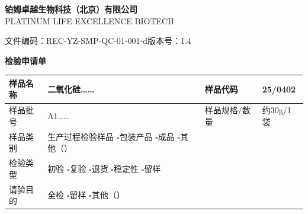 \documentclass[UTF8,10pt,a4paper,fontset=fandol]{ctexart}
\newcommand{\fieldvalue}[1]{#1}
\newcommand{\handwritten}[1]{#1}
\begin{document}
\noindent
\begin{minipage}{0.28\textwidth}
\small
\textbf{铂姆卓越生物科技（北京）有限公司}\\[-0.2em]
\scriptsize PLATINUM LIFE EXCELLENCE BIOTECH
\end{minipage}
\hfill
\begin{minipage}{0.68\textwidth}
\raggedleft
文件编码：REC-YZ-SMP-QC-01-001-d\qquad 版本号：1.4
\end{minipage}

\vspace{0.3em}

\begin{center}
\textbf{\large 检验申请单}
\end{center}

\small
\begin{tabularx}{\textwidth}{|>{\centering\arraybackslash}p{2.2cm}|X|>{\centering\arraybackslash}p{2.2cm}|X|}
\hline
样品名称 &
\fieldvalue{\handwritten{二氧化硅……}} &
样品代码 &
\fieldvalue{\handwritten{25/0402}}
\\ \hline

样品批号 &
\fieldvalue{\handwritten{A1……}} &
样品规格/数量 &
\fieldvalue{\handwritten{约30g/1袋}}
\\ \hline

样品类别 &
\fieldvalue{\handwritten{\checkmark}}生产过程检验样品
\quad $\square$包装产品
\quad $\square$成品
\newline
\hspace*{2.2cm}$\square$其他（\hspace{2cm}） &
\multicolumn{2}{l|}{}
\\ \hline

检验类型 &
\fieldvalue{\handwritten{\checkmark}}初验
\quad $\square$复验
\quad $\square$退货
\quad $\square$稳定性
\quad $\square$留样
&
\multicolumn{2}{l|}{}
\\ \hline

请验目的 &
\fieldvalue{\handwritten{\checkmark}}全检
\quad $\square$留样
\quad $\square$其他（\hspace{2cm}）
&
\multicolumn{2}{l|}{}
\\ \hline


\end{tabularx}
\end{document}
